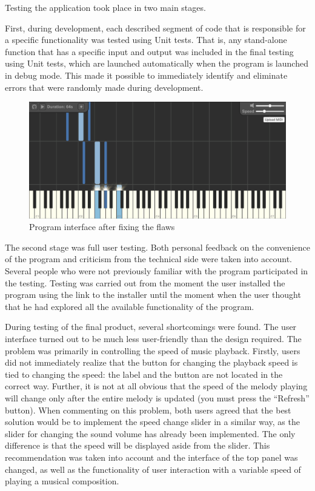 \documentclass[thesis=B,english]{FITthesis}[2019/12/23]
\begin{document}
Testing the application took place in two main stages.

First, during development, each described segment of code that is responsible for a specific functionality was tested using Unit tests. That is, any stand-alone function that has a specific input and output was included in the final testing using Unit tests, which are launched automatically when the program is launched in debug mode. This made it possible to immediately identify and eliminate errors that were randomly made during development.

\begin{figure}[ht]
            \centering
            \includegraphics[width=\textwidth]{Interface2.png}
            \caption{Program interface after fixing the flaws}
            \label{fig:Interface2}
\end{figure}

The second stage was full user testing. Both personal feedback on the convenience of the program and criticism from the technical side were taken into account. Several people who were not previously familiar with the program participated in the testing. Testing was carried out from the moment the user installed the program using the link to the installer until the moment when the user thought that he had explored all the available functionality of the program.

During testing of the final product, several shortcomings were found. The user interface turned out to be much less user-friendly than the design required. The problem was primarily in controlling the speed of music playback. Firstly, users did not immediately realize that the button for changing the playback speed is tied to changing the speed: the label and the button are not located in the correct way. Further, it is not at all obvious that the speed of the melody playing will change only after the entire melody is updated (you must press the “Refresh” button). When commenting on this problem, both users agreed that the best solution would be to implement the speed change slider in a similar way, as the slider for changing the sound volume has already been implemented. The only difference is that the speed will be displayed aside from the slider. This recommendation was taken into account and the interface of the top panel was changed, as well as the functionality of user interaction with a variable speed of playing a musical composition.
\end{document}
